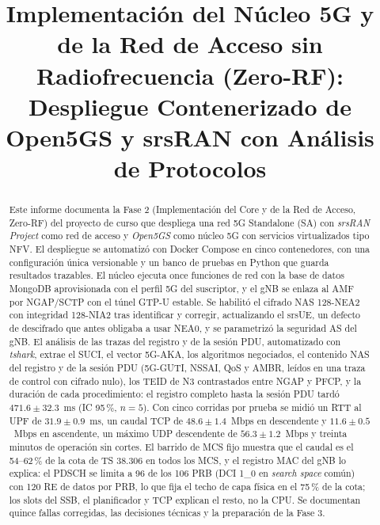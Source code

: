\documentclass[conference]{IEEEtran}
\begin{document}
\title{Implementación del Núcleo 5G y de la Red de Acceso sin Radiofrecuencia (Zero-RF): Despliegue Contenerizado de Open5GS y srsRAN con Análisis de Protocolos}

\author{
}

\maketitle

\begin{abstract}
Este informe documenta la Fase 2 (Implementación del Core y de la Red de Acceso, Zero-RF) del proyecto de curso que despliega una red 5G Standalone (SA) con \textit{srsRAN Project} como red de acceso y \textit{Open5GS} como núcleo 5G con servicios virtualizados tipo NFV. El despliegue se automatizó con Docker Compose en cinco contenedores, con una configuración única versionable y un banco de pruebas en Python que guarda resultados trazables. El núcleo ejecuta once funciones de red con la base de datos MongoDB aprovisionada con el perfil 5G del suscriptor, y el gNB se enlaza al AMF por NGAP/SCTP con el túnel GTP-U estable. Se habilitó el cifrado NAS 128-NEA2 con integridad 128-NIA2 tras identificar y corregir, actualizando el srsUE, un defecto de descifrado que antes obligaba a usar NEA0, y se parametrizó la seguridad AS del gNB. El análisis de las trazas del registro y de la sesión PDU, automatizado con \textit{tshark}, extrae el SUCI, el vector 5G-AKA, los algoritmos negociados, el contenido NAS del registro y de la sesión PDU (5G-GUTI, NSSAI, QoS y AMBR, leídos en una traza de control con cifrado nulo), los TEID de N3 contrastados entre NGAP y PFCP, y la duración de cada procedimiento: el registro completo hasta la sesión PDU tardó $471.6\pm32.3$~ms (IC 95\,\%, $n=5$). Con cinco corridas por prueba se midió un RTT al UPF de $31.9\pm0.9$~ms, un caudal TCP de $48.6\pm1.4$~Mbps en descendente y $11.6\pm0.5$~Mbps en ascendente, un máximo UDP descendente de $56.3\pm1.2$~Mbps y treinta minutos de operación sin cortes. El barrido de MCS fijo muestra que el caudal es el 54--62\,\% de la cota de TS 38.306 en todos los MCS, y el registro MAC del gNB lo explica: el PDSCH se limita a 96 de los 106 PRB (DCI 1\_0 en \textit{search space} común) con 120 RE de datos por PRB, lo que fija el techo de capa física en el 75\,\% de la cota; los slots del SSB, el planificador y TCP explican el resto, no la CPU. Se documentan quince fallas corregidas, las decisiones técnicas y la preparación de la Fase 3.
\end{abstract}
\end{document}
